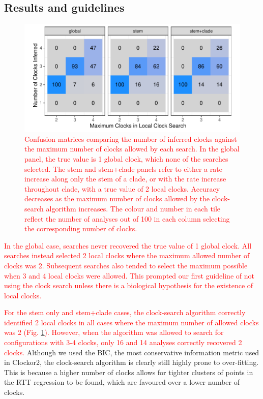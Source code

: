 \documentclass{article}
\begin{document}
\subsection*{Results and guidelines}
\begin{figure}[H]
\centering
\includegraphics[width = \linewidth]{inferredClocks.pdf}
\caption{\textcolor{red}{Confusion matrices comparing the number of inferred clocks against the maximum number of clocks allowed by each search. In the global panel, the true value is 1 global clock, which none of the searches selected.  The stem and stem+clade panels refer to either a rate increase along only the stem of a clade, or with the rate increase throughout clade, with a true value of 2 local clocks. Accuracy decreases as the maximum number of clocks allowed by the clock-search algorithm increases. The colour and number in each tile reflect the number of analyses out of 100 in each column selecting the corresponding number of clocks.}}
\label{fig:simStudy}
\end{figure}

\textcolor{red}{In the global case, searches never recovered the true value of 1 global clock. All searches instead selected 2 local clocks where the maximum allowed number of clocks was 2. Subsequent searches also tended to select the maximum possible when 3 and 4 local clocks were allowed. This prompted our first guideline of not using the clock search unless there is a biological hypothesis for the existence of local clocks.}

\textcolor{red}{For the stem only and stem+clade cases, the clock-search algorithm correctly identified 2 local clocks in all cases where the maximum number of allowed clocks was 2 (Fig. \ref{fig:simStudy}). However, when the algorithm was allowed to search for configurations with 3-4 clocks, only 16 and 14 analyses correctly recovered 2 clocks.}
Although we used the BIC, the most conservative information metric used in Clockor2, the clock-search algorithm is clearly still highly prone to over-fitting. This is because a higher number of clocks allows for tighter clusters of points in the RTT regression to be found, which are favoured over a lower number of clocks.
\end{document}
